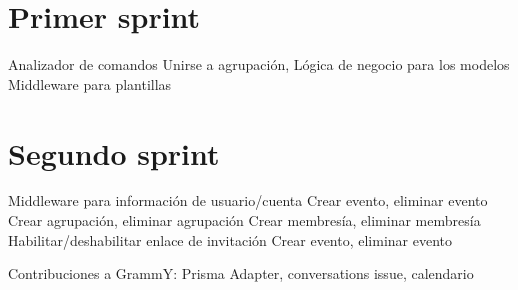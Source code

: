 

\section{Primer sprint}

Analizador de comandos
Unirse a agrupación,
Lógica de negocio para los modelos
Middleware para plantillas


\section{Segundo sprint}

Middleware para información de usuario/cuenta
Crear evento, eliminar evento
Crear agrupación, eliminar agrupación
Crear membresía, eliminar membresía
Habilitar/deshabilitar enlace de invitación
Crear evento, eliminar evento

Contribuciones a GrammY: Prisma Adapter, conversations issue, calendario




